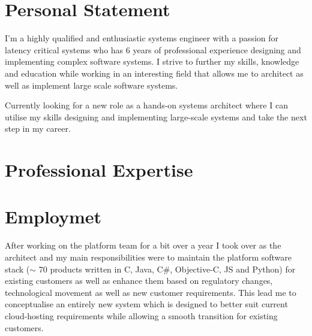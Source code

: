 \documentclass[11pt,a4paper]{my_cv}
\begin{document}
\begin{cvheader}
\end{cvheader}

\section{Personal Statement}
I'm a highly qualified and enthusiastic systems engineer with a passion for latency critical systems who has 6 years of professional experience designing and implementing complex software systems. I strive to further my skills, knowledge and education while working in an interesting field that allows me to architect as well as implement large scale software systems.

Currently looking for a new role as a hands-on systems architect where I can utilise my skills designing and implementing large-scale systems and take the next step in my career.


\section{Professional Expertise}
\begin{expertise}
\end{expertise}

\section{Employmet}
After working on the platform team for a bit over a year I took over as the architect and my main responsibilities were to maintain the platform software stack ($\sim$ 70 products written in C, Java, C\#, Objective-C, JS and Python) for existing customers as well as enhance them based on regulatory changes, technological movement as well as new customer requirements. This lead me to conceptualise an entirely new system which is designed to better suit current cloud-hosting requirements while allowing a smooth transition for existing customers.
\end{document}
